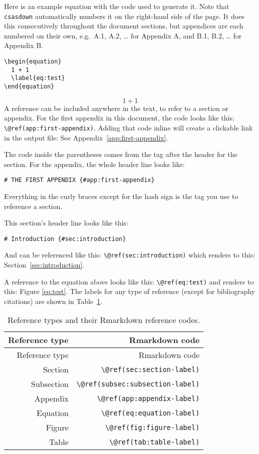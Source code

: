 \documentclass[12pt]{article}\usepackage[]{graphicx}\usepackage[]{color}
\begin{document}
Here is an example equation with the code used to generate it. Note that \texttt{csasdown} automatically numbers it on the right-hand side of the page. It does this consecutively throughout the document sections, but appendices are each numbered on their own, e.g.~A.1, A.2, \ldots{} for Appendix A, and B.1, B.2, \ldots{} for Appendix B.
\begin{verbatim}
\begin{equation}
  1 + 1
  \label{eq:test}
\end{equation}
\end{verbatim}
\begin{equation}
  1 + 1
  \label{eq:test}
\end{equation}
A reference can be included anywhere in the text, to refer to a section or appendix. For the first appendix in this document, the code looks like this: \texttt{\textbackslash{}@ref(app:first-appendix)}. Adding that code inline will create a clickable link in the output file: See Appendix~\ref{app:first-appendix}.

The code inside the parentheses comes from the tag after the header for the section. For the appendix, the whole header line looks like:

\texttt{\#\ THE\ FIRST\ APPENDIX\ \{\#app:first-appendix\}}

Everything in the curly braces except for the hash sign is the tag you use to reference a section.

This section's header line looks like this:

\texttt{\#\ Introduction\ \{\#sec:introduction\}}

And can be referenced like this: \texttt{\textbackslash{}@ref(sec:introduction)} which renders to this: Section~\ref{sec:introduction}.

A reference to the equation above looks like this: \texttt{\textbackslash{}@ref(eq:test)} and renders to this: Figure \eqref{eq:test}. The labels for any type of reference (except for bibliography citations) are shown in Table~\ref{tab:ref-tab}.
\begin{longtable}[]{@{}rr@{}}
\caption{\label{tab:ref-tab}Reference types and their Rmarkdown reference codes.}\tabularnewline
\toprule
Reference type & Rmarkdown code\tabularnewline
\midrule
\endfirsthead
\toprule
Reference type & Rmarkdown code\tabularnewline
\midrule
\endhead
Section & \texttt{\textbackslash{}@ref(sec:section-label)}\tabularnewline
Subsection & \texttt{\textbackslash{}@ref(subsec:subsection-label)}\tabularnewline
Appendix & \texttt{\textbackslash{}@ref(app:appendix-label)}\tabularnewline
Equation & \texttt{\textbackslash{}@ref(eq:equation-label)}\tabularnewline
Figure & \texttt{\textbackslash{}@ref(fig:figure-label)}\tabularnewline
Table & \texttt{\textbackslash{}@ref(tab:table-label)}\tabularnewline
\bottomrule
\end{longtable}
\end{document}
